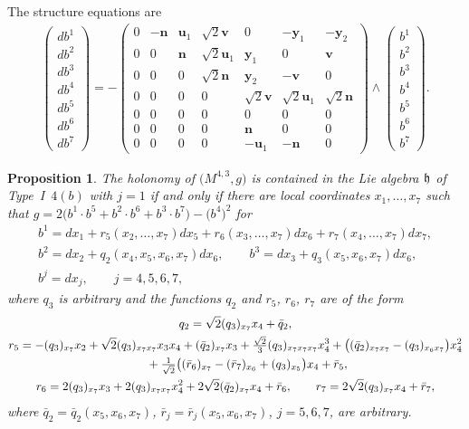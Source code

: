 \documentclass[11pt]{article}
\numberwithin{equation}{section}
\newtheorem{Proposition}[Theorem]{Proposition}
 { \theoremstyle{definition}
\newtheorem{Definition}[Theorem]{Definition}
\newtheorem{Example}[Theorem]{Example}
\newtheorem{Remark}[Theorem]{Remark} }
\newcommand\fh{{\frak h}}
\newcommand\bu{{\mathbf u}}
\newcommand\by{{\mathbf y}}
\newcommand\bn{{\mathbf n}}
\newcommand\bv{{\mathbf v}}
\begin{document}
The structure equations are
\begin{gather}\label{EI4(b)j=1}\left(\begin{matrix} db^1\\db^2\\db^3\\db^4\\db^5\\db^6\\db^7\end{matrix}\right) = -\left(
\begin{matrix}
0 &-\bn&\bu_1&\sqrt 2 \bv&0&-\by_1&-\by_2\\
0&0&\bn&\sqrt2 \bu_1&\by_1&0&\bv\\
0&0&0&\sqrt 2 \bn&\by_2&-\bv&0\\
0&0&0&0&\sqrt 2 \bv&\sqrt2 \bu_1&\sqrt 2 \bn\\
0&0&0&0&0&0&0\\
0&0&0&0&\bn&0&0\\
0&0&0&0&-\bu_1&-\bn&0
\end{matrix}\right) \wedge \left(\begin{matrix} b^1\\b^2\\b^3\\b^4\\b^5\\b^6\\b^7\end{matrix}\right).
\end{gather}
%
\begin{Proposition} The holonomy of $\big(M^{4,3},g\big)$ is contained in the Lie algebra $\fh$ of Type~I~$4(b)$ with $j=1$
if and only if there are local coordinates $x_1,\dots,x_7$ such that $g=2\big(b^1\cdot b^5+b^2\cdot b^6+b^3\cdot b^7\big)- \big(b^4\big)^2$ for
\begin{gather*}
b^1= dx_1 + r_5(x_2,\dots, x_7)dx_5+r_6(x_3,\dots,x_7)dx_6+r_7(x_4,\dots,x_7)dx_7, \nonumber \\
b^2= dx_2 +q_2(x_4,x_5,x_6,x_7) dx_6, \qquad
b^3= dx_3+q_3(x_5,x_6,x_7) dx_6 ,\\ %
b^j= dx_j, \qquad j=4,5,6,7,
\end{gather*}
where $q_3$ is arbitrary and the functions $q_2$ and $r_5$, $r_6$, $r_7$ are of the form
\begin{gather*}
q_2 = \sqrt2 (q_3)_{x_7}x_4 +\bar q_2,\\
r_5 = -(q_3)_{x_7}x_2+\sqrt2 (q_3)_{x_7 x_7}x_3 x_4+(\bar q_2)_{x_7}x_3+ \tfrac{\sqrt2}3(q_3)_{x_7 x_7 x_7}x_4^3+\big((\bar q_2)_{x_7 x_7}-(q_3)_{x_6 x_7}\big)x_4^2 \\
 \hphantom{r_5 =}{} + \tfrac1 {\sqrt2}\big((\bar r_6)_{x_7}-(\bar r_7)_{x_6}+(q_3)_{x_5}\big)x_4+\bar r_5, \\
r_6 = 2(q_3)_{x_7}x_3+2(q_3)_{x_7 x_7}x_4^2+2\sqrt2(\bar q_2)_{x_7} x_4+\bar r_6, \qquad
r_7 = 2\sqrt2 (q_3)_{x_7}x_4+\bar r_7,
\end{gather*}
where $\bar q_2=\bar q_2(x_5,x_6,x_7)$, $\bar r_j =\bar r_j (x_5,x_6,x_7)$, $j=5,6,7$, are arbitrary.
\end{Proposition}
\end{document}
